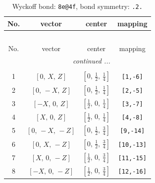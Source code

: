 \documentclass[fleqn,8pt]{jsarticle}
\begin{document}
\begin{longtable}{cccc}
\caption{Wyckoff bond: {\tt 8e@4f}, bond symmetry: {\tt .2.}}
 \\
 \hline \hline
No. & vector & center & mapping \\ \hline \endfirsthead

\multicolumn{3}{l}{\tablename\ \thetable{}} \\
 \hline \hline
No. & vector & center & mapping \\ \hline \endhead

 \hline \hline
\multicolumn{3}{r}{\footnotesize\it continued ...} \\ \endfoot

 \hline \hline
\multicolumn{3}{r}{} \\ \endlastfoot

1 & $\left[ 0,\, X,\, Z \right]$ & $\left[ 0,\, \frac{1}{2},\, \frac{1}{4} \right]$ & {\tt [1,-6]} \\ \hline
2 & $\left[ 0,\, - X,\, Z \right]$ & $\left[ 0,\, \frac{1}{2},\, \frac{1}{4} \right]$ & {\tt [2,-5]} \\ \hline
3 & $\left[ - X,\, 0,\, Z \right]$ & $\left[ \frac{1}{2},\, 0,\, \frac{1}{4} \right]$ & {\tt [3,-7]} \\ \hline
4 & $\left[ X,\, 0,\, Z \right]$ & $\left[ \frac{1}{2},\, 0,\, \frac{1}{4} \right]$ & {\tt [4,-8]} \\ \hline
5 & $\left[ 0,\, - X,\, - Z \right]$ & $\left[ 0,\, \frac{1}{2},\, \frac{3}{4} \right]$ & {\tt [9,-14]} \\ \hline
6 & $\left[ 0,\, X,\, - Z \right]$ & $\left[ 0,\, \frac{1}{2},\, \frac{3}{4} \right]$ & {\tt [10,-13]} \\ \hline
7 & $\left[ X,\, 0,\, - Z \right]$ & $\left[ \frac{1}{2},\, 0,\, \frac{3}{4} \right]$ & {\tt [11,-15]} \\ \hline
8 & $\left[ - X,\, 0,\, - Z \right]$ & $\left[ \frac{1}{2},\, 0,\, \frac{3}{4} \right]$ & {\tt [12,-16]} \\
\end{longtable}
\renewcommand{\arraystretch}{1.2}
\end{document}
